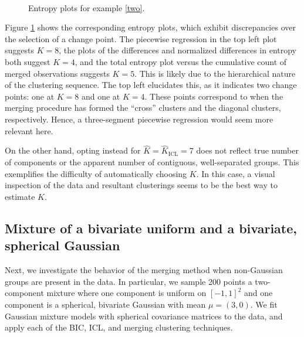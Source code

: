 \documentclass{uwstat572}
\newcommand*\estim[1]{\widehat{#1}}
\renewcommand\;{\,}
\begin{document}
\begin{figure}
\begin{center}
\\
\end{center}
\caption{Entropy plots for example \ref{two}.}
\label{Entropy2}
\end{figure}

Figure \ref{Entropy2} shows the corresponding entropy plots, which exhibit discrepancies over the selection of a change point.
The piecewise regression in the top left plot suggests $K = 8$, the plots of the differences and normalized differences in entropy both suggest $K = 4$, and the total entropy plot versus the cumulative count of merged observations suggests $K = 5$.
This is likely due to the hierarchical nature of the clustering sequence.
The top left elucidates this, as it indicates two change points: one at $K = 8$ and one at $K = 4$.
These points correspond to when the merging procedure has formed the ``cross'' clusters and the diagonal clusters, respectively. 
Hence, a three-segment piecewise regression would seem more relevant here.

On the other hand, opting instead for $\estim K = \estim K_{\text{ICL}} = 7$ does not reflect true number of components or the apparent number of contiguous, well-separated groups.
This exemplifies the difficulty of automatically choosing $K$.
In this case, a visual inspection of the data and resultant clusterings seems to be the best way to estimate $\estim K$.

\subsection{Mixture of a bivariate uniform and a bivariate, spherical Gaussian}\label{three}
Next, we investigate the behavior of the merging method when non-Gaussian groups are present in the data.
In particular, we sample 200 points a two-component mixture where one component is uniform on $[-1, 1]^2$ and one component is a spherical, bivariate Gaussian with mean $\mu = (3, 0)$.
We fit Gaussian mixture models with spherical covariance matrices to the data, and apply each of the BIC, ICL, and merging clustering techniques.
\end{document}
